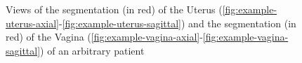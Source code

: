 \documentclass[12pt,twoside]{report}
\begin{document}
\begin{figure}[H]
{  }
  \caption{Views of the segmentation (in red) of the Uterus (\ref{fig:example-uterus-axial}-\ref{fig:example-uterus-sagittal}) and  the segmentation (in red) of the Vagina (\ref{fig:example-vagina-axial}-\ref{fig:example-vagina-sagittal}) of an arbitrary patient}
\end{figure}



\end{document}
